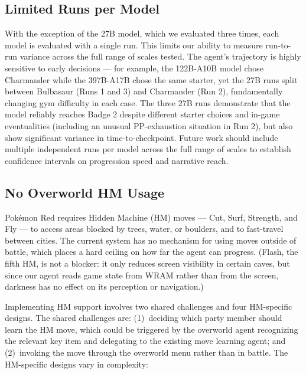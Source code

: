 \documentclass{article}
\begin{document}
\subsection{Limited Runs per Model}

With the exception of the 27B model, which we evaluated three times, each model is evaluated with a single run. This limits our ability to measure run-to-run variance across the full range of scales tested. The agent's trajectory is highly sensitive to early decisions --- for example, the 122B-A10B model chose Charmander while the 397B-A17B chose the same starter, yet the 27B runs split between Bulbasaur (Runs 1 and 3) and Charmander (Run 2), fundamentally changing gym difficulty in each case. The three 27B runs demonstrate that the model reliably reaches Badge 2 despite different starter choices and in-game eventualities (including an unusual PP-exhaustion situation in Run 2), but also show significant variance in time-to-checkpoint. Future work should include multiple independent runs per model across the full range of scales to establish confidence intervals on progression speed and narrative reach.

\subsection{No Overworld HM Usage}

Pok\'{e}mon Red requires Hidden Machine (HM) moves --- Cut, Surf, Strength, and Fly --- to access areas blocked by trees, water, or boulders, and to fast-travel between cities. The current system has no mechanism for using moves outside of battle, which places a hard ceiling on how far the agent can progress. (Flash, the fifth HM, is not a blocker: it only reduces screen visibility in certain caves, but since our agent reads game state from WRAM rather than from the screen, darkness has no effect on its perception or navigation.)

Implementing HM support involves two shared challenges and four HM-specific designs. The shared challenges are: (1)~deciding which party member should learn the HM move, which could be triggered by the overworld agent recognizing the relevant key item and delegating to the existing move learning agent; and (2)~invoking the move through the overworld menu rather than in battle. The HM-specific designs vary in complexity:
\end{document}
